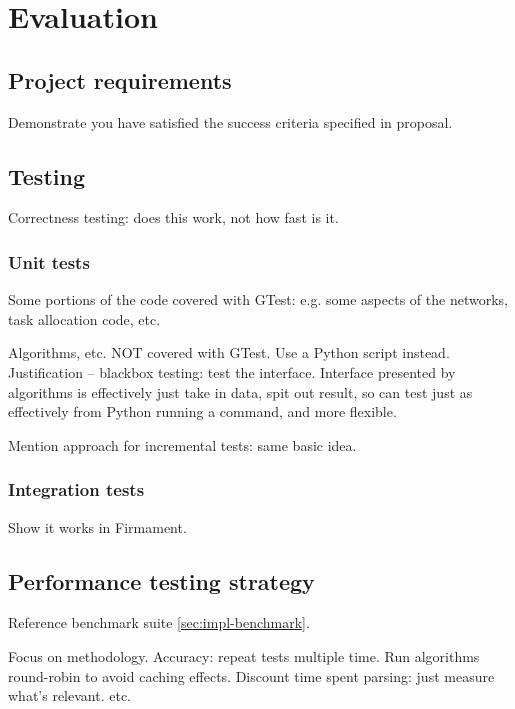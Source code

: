 \chapter{Evaluation} \label{chap:eval}


\section{Project requirements} 

Demonstrate you have satisfied the success criteria specified in proposal.

\section{Testing}

Correctness testing: does this work, not how fast is it.

\subsection{Unit tests} \label{sec:eval-testing-unit}
Some portions of the code covered with GTest: e.g. some aspects of the networks, task allocation code, etc. 

Algorithms, etc. NOT covered with GTest. Use a Python script instead. Justification -- blackbox testing: test the interface. Interface presented by algorithms is effectively just take in data, spit out result, so can test just as effectively from Python running a command, and more flexible.

Mention approach for incremental tests: same basic idea.

\subsection{Integration tests} \label{sec:eval-test-integration}

Show it works in Firmament.

\section{Performance testing strategy} \label{sec:eval-benchmark-strategy}

Reference benchmark suite \ref{sec:impl-benchmark}. 

Focus on methodology. Accuracy: repeat tests multiple time. Run algorithms round-robin to avoid caching effects. Discount time spent parsing: just measure what's relevant. etc.

